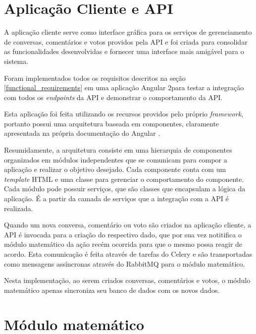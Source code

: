   \section{Aplicação Cliente e API}
    
    A aplicação cliente serve como interface gráfica para os serviços de 
    gerenciamento de conversas, comentários e votos providos pela API e foi
    criada para consolidar as funcionalidades desenvolvidas e fornecer uma interface mais
    amigável para o sistema.
    
    Foram implementados todos os requisitos descritos na seção \ref{functional_requirements}
    em uma aplicação Angular 2\footnotemark para
    testar a integração com todos os \textit{endpoints} da API e demonstrar o comportamento da API.
    
    Esta aplicação foi feita utilizando os recursos providos pelo próprio \textit{framework}, portanto
    possui uma arquitetura baseada em componentes, claramente apresentada na própria documentação do Angular \footnotemark.
    
    Resumidamente, a arquitetura consiste em uma hierarquia de componentes organizados
    em módulos independentes que se comunicam para compor a aplicação e realizar o objetivo desejado.
    Cada componente conta com um \textit{template} HTML e uma classe para gerenciar o comportamento do componente.
    Cada módulo pode possuir serviços, que são classes que encapsulam a lógica da aplicação.
    É a partir da camada de serviços que a integração com a API é realizada.
    
    Quando um nova conversa, comentário ou voto são criados na aplicação cliente,
    a API é invocada para a criação do respectivo dado, que por sua vez
    notitifica o módulo matemático da ação recém ocorrida para que o mesmo possa reagir de acordo.
    Esta comunicação é feita através de tarefas do Celery e são transportadas como mensagens assíncronas
    através do RabbitMQ para o módulo matemático.
    
    Nesta implementação, ao serem criados conversas, comentários e votos, o módulo matemático apenas
    sincroniza seu banco de dados com os novos dados.
  
  \section{Módulo matemático}
     
